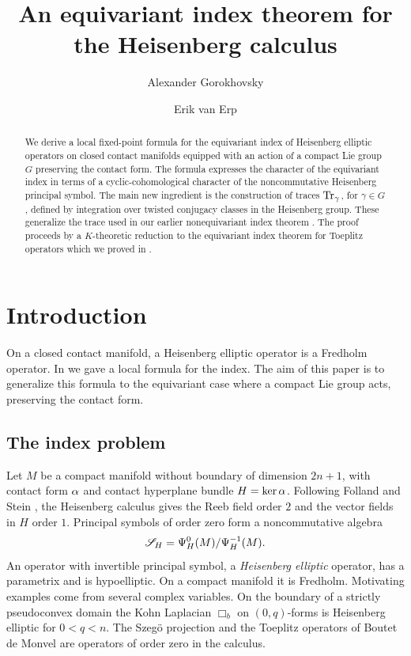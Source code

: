 \documentclass[11pt]{amsart}
\title{An equivariant index theorem for the Heisenberg calculus}
\author{Alexander Gorokhovsky}
\author{Erik van Erp}
\theoremstyle{plain}
\theoremstyle{definition}
\theoremstyle{remark}
\begin{document}
\begin{abstract}
We derive a local fixed-point formula for the equivariant index of Heisenberg elliptic operators on closed contact manifolds equipped with an action of a compact Lie group $G$ preserving the contact form. 
The formula expresses the character of the equivariant index in terms of a cyclic-cohomological character of the noncommutative Heisenberg principal symbol. 
The main new ingredient is the construction of traces $\operatorname{Tr}_\gamma$, for $\gamma\in G$, defined by integration over twisted conjugacy classes in the Heisenberg group. 
These generalize the trace used in our earlier nonequivariant index theorem \cite{GvE20}. The proof proceeds by a $K$-theoretic reduction to the equivariant index theorem for Toeplitz operators which we proved in \cite{GvE26}.
\end{abstract}
\maketitle

\setcounter{tocdepth}{1}
\tableofcontents




\section{Introduction}

On a closed contact manifold, a Heisenberg elliptic operator is a Fredholm operator.
In \cite{GvE20} we gave a local formula for the index.
The aim of this paper is to generalize this formula to the equivariant case where a compact Lie group acts, preserving the contact form.

\subsection{The index problem}
Let $M$ be a compact manifold without boundary of dimension $2n+1$, with contact form $\alpha$ and contact hyperplane bundle $H=\ker\alpha$.
Following Folland and Stein \cite{FS74}, the Heisenberg calculus \cite{Ta84,BG88} gives the Reeb field order $2$ and the vector fields in $H$ order $1$.
Principal symbols of order zero form a noncommutative algebra \[{\mathscr{S}_H}=\Psi^0_H(M)/\Psi^{-1}_H(M).\]
An operator with invertible principal symbol, a \emph{Heisenberg elliptic} operator, has a parametrix and is hypoelliptic. On a compact manifold it is Fredholm.
Motivating examples come from several complex variables. 
On the boundary of a strictly pseudoconvex domain the Kohn Laplacian $\Box_b$ on $(0,q)$-forms is Heisenberg elliptic for  $0<q<n$. The Szeg\"{o} projection and the Toeplitz operators of Boutet de Monvel \cite{Bo79} are operators of order zero in the calculus.
\end{document}
